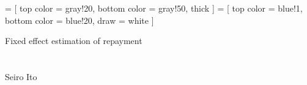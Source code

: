 

\renewcommand\Routcolor{\color{gray30}}
\newtheorem{finding}{Finding}[section]
\makeatletter
\g@addto@macro{\UrlBreaks}{\UrlOrds}
\newcommand\gobblepars{%
    \@ifnextchar\par%
        {\expandafter\gobblepars\@gobble}%
        {}}
\newenvironment{lightgrayleftbar}{%
  \def\FrameCommand{\textcolor{lightgray}{\vrule width 1zw} \hspace{10pt}}%
  \MakeFramed {\advance\hsize-\width \FrameRestore}}%
{\endMakeFramed}
\newenvironment{palepinkleftbar}{%
  \def\FrameCommand{\textcolor{palepink}{\vrule width 1zw} \hspace{10pt}}%
  \MakeFramed {\advance\hsize-\width \FrameRestore}}%
{\endMakeFramed}
\makeatother
{}
\usepackage{caption}
\usepackage{setspace}
\usepackage{framed}
\def\pgfsysdriver{pgfsys-dvipdfm.def}
\usepackage{tikz}
\usetikzlibrary{calc, arrows, decorations, decorations.pathreplacing, backgrounds}
\usepackage{adjustbox}
 =
[
top color = gray!20, bottom color = gray!50, thick
]
 =
[
top color = blue!1, bottom color = blue!20, draw = white
]



\setlength{\baselineskip}{12pt}

\hfil Fixed effect estimation of repayment\\

\hfil\MonthDY\\
\hfil{\footnotesize\currenttime}\\

\hfil Seiro Ito

